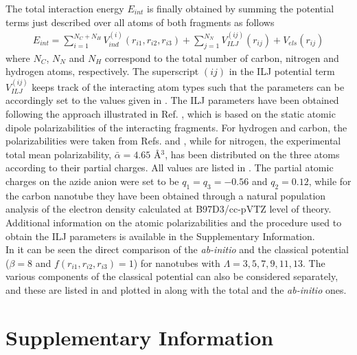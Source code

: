 \documentclass[utf8]{article}
\begin{document}
The total interaction energy $E_{int}$ is finally obtained by summing the potential terms just described over all atoms of both fragments as follows
%
\begin{align}
    E_{int} = \sum_{i=1}^{N_C + N_H} V^{(i)}_{ind}(r_{i1},r_{i2},r_{i3}) +
              \sum_{j=1}^{N_N} V_{ILJ}^{(ij)}(r_{ij}) + V_{els}(r_{ij})
\end{align}
%
where $N_C$, $N_N$ and $N_H$ correspond to the total number of carbon, nitrogen and hydrogen atoms, respectively.
The superscript $(ij)$ in the ILJ potential term $V_{ILJ}^{(ij)}$ keeps track of the interacting atom types such that the parameters can be accordingly set to the values given in .
The ILJ parameters have been obtained following the approach illustrated in Ref. , which is based on the static atomic dipole polarizabilities of the interacting fragments.
For hydrogen and carbon, the polarizabilities were taken from Refs.  and , while for nitrogen, the \ntm experimental total mean polarizability\cite{Borgne1999}, $\bar{\alpha} = 4.65$ \AA$^3$, has been distributed on the three atoms according to their partial charges.
All values are listed in .
The partial atomic charges on the azide anion were set to be $q_1 = q_3 = -0.56$ and $q_2 = 0.12$, while for the carbon nanotube they have been obtained through a natural population analysis\cite{Reed1985a} of the electron density calculated at B97D3/cc-pVTZ level of theory.\\
Additional information on the atomic polarizabilities and the procedure used to obtain the ILJ parameters is available in the Supplementary Information.\\

In  it can be seen the direct comparison of the \emph{ab-initio} and the classical potential ($\beta = 8$ and $f(r_{i1},r_{i2},r_{i3}) = 1$) for nanotubes with $\Lambda = 3,5,7,9,11,13$. 
The various components of the classical potential can also be considered separately, and these are listed in  and plotted in  along with the total and the \emph{ab-initio} ones.

\clearpage




\clearpage
\section{Supplementary Information}
\end{document}
